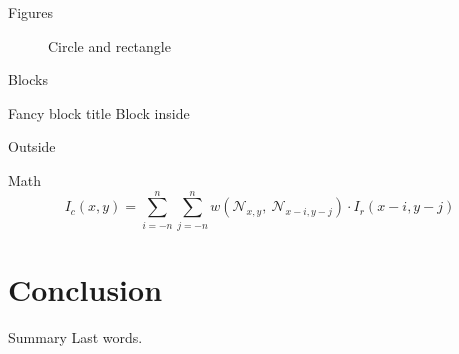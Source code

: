 \documentclass[compress]{beamer}
\begin{document}
\begin{frame}{Figures}
  \begin{figure}
    \caption{Circle and rectangle}
  \end{figure}
\end{frame}

\begin{frame}{Blocks}
  \begin{block}{Fancy block title}
    Block inside
  \end{block}

  Outside
\end{frame}

\begin{frame}{Math}
  \begin{equation*}
    I_c(x,y) = \sum_{i=-n}^n\sum_{j=-n}^n w\left(
      \mathcal{N}_{x,y},\ \mathcal{N}_{x-i, y-j}\right)
      \cdot
      I_r(x-i,y-j)
  \end{equation*}
\end{frame}


\section{Conclusion}

\begin{frame}{Summary}
  Last words.
\end{frame}

\end{document}
